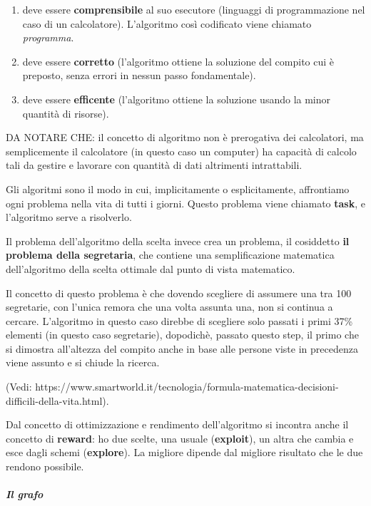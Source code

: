 \documentclass[
  paper=a4,
  oneside  ,captions=tableheading
]{scrbook}
\providecommand{\tightlist}{%
  \setlength{\itemsep}{0pt}\setlength{\parskip}{0pt}}
\begin{document}
\begin{enumerate}
\def\labelenumi{\arabic{enumi}.}
\tightlist
\item
  deve essere \textbf{comprensibile} al suo esecutore (linguaggi di
  programmazione nel caso di un calcolatore). L'algoritmo così
  codificato viene chiamato \emph{programma}.
\item
  deve essere \textbf{corretto } (l'algoritmo ottiene la soluzione del
  compito cui è preposto, senza errori in nessun passo fondamentale).
\item
  deve essere \textbf{efficente} (l'algoritmo ottiene la soluzione
  usando la minor quantità di risorse).
\end{enumerate}

DA NOTARE CHE: il concetto di algoritmo non è prerogativa dei
calcolatori, ma semplicemente il calcolatore (in questo caso un
computer) ha capacità di calcolo tali da gestire e lavorare con quantità
di dati altrimenti intrattabili.

Gli algoritmi sono il modo in cui, implicitamente o esplicitamente,
affrontiamo ogni problema nella vita di tutti i giorni. Questo problema
viene chiamato \textbf{task}, e l'algoritmo serve a risolverlo.

Il problema dell'algoritmo della scelta invece crea un problema, il
cosiddetto \textbf{il problema della segretaria}, che contiene una
semplificazione matematica dell'algoritmo della scelta ottimale dal
punto di vista matematico.

Il concetto di questo problema è che dovendo scegliere di assumere una
tra 100 segretarie, con l'unica remora che una volta assunta una, non si
continua a cercare. L'algoritmo in questo caso direbbe di scegliere solo
passati i primi 37\% elementi (in questo caso segretarie), dopodichè,
passato questo step, il primo che si dimostra all'altezza del compito
anche in base alle persone viste in precedenza viene assunto e si chiude
la ricerca.

(Vedi:
https://www.smartworld.it/tecnologia/formula-matematica-decisioni-difficili-della-vita.html).

Dal concetto di ottimizzazione e rendimento dell'algoritmo si incontra
anche il concetto di \textbf{reward}: ho due scelte, una usuale
(\textbf{exploit}), un altra che cambia e esce dagli schemi
(\textbf{explore}). La migliore dipende dal migliore risultato che le
due rendono possibile.

\hypertarget{il-grafo}{%
\subparagraph{Il grafo}\label{il-grafo}}
\end{document}
